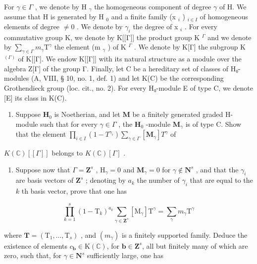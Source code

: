 For \(\gamma\in\Gamma\) , we denote by H \(_{\gamma}\) the homogeneous component of degree \(\gamma\) of H. We assume that H is generated by H \(_{0}\) and a finite family (x \(_{i}\) ) \(_{i\in I}\) of homogeneous elements of degree \(\neq0\) . We denote by \(\gamma_{i}\) the degree of x \(_{i}\) . For every commutative group K, we denote by K{[}{[}Γ{]}{]} the product group K \(^{\Gamma}\) and we denote by \(\sum_{\gamma\in\Gamma}m_{\gamma}\text{T}^{\gamma}\) the element (m \(_{\gamma}\) ) of K \(^{\Gamma}\) . We denote by K{[}Γ{]} the subgroup K \(^{(\Gamma)}\) of K{[}{[}Γ{]}. We endow K{[}{[}Γ{]}{]} with its natural structure as a module over the algebra Z{[}Γ{]} of the group Γ. Finally, let C be a hereditary set of classes of H₀-modules (A, VIII, § 10, no. 1, def. 1) and let K(C) be the corresponding Grothendieck group (loc. cit., no. 2). For every H₀-module E of type C, we denote {[}E{]} its class in K(C).

\begin{enumerate}
\def\labelenumi{\alph{enumi})}
\tightlist
\item
  Suppose \(\mathbf{H}_0\) is Noetherian, and let \(\mathbf{M}\) be a finitely generated graded H-module such that for every \(\gamma \in \Gamma\) , the \(\mathbf{H}_0\) -module \(\mathbf{M}_{\gamma}\) is of type C. Show that the element \(\prod_{i \in I} (1 - T^{\gamma_i}) \sum_{\gamma \in \Gamma} [\mathbf{M}_{\gamma}] T^{\gamma}\) of
\end{enumerate}

\(K(\mathbb{C})[[\Gamma]]\) belongs to \(K(\mathbb{C})[\Gamma]\) .

\begin{enumerate}
\def\labelenumi{\alph{enumi})}
\setcounter{enumi}{1}
\tightlist
\item
  Suppose now that \(\Gamma = \mathbf{Z}^s\) , \(\mathrm{H}_{\gamma} = 0\) and \(\mathbf{M}_{\gamma} = 0\) for \(\gamma \notin \mathbf{N}^s\) , and that the \(\gamma_i\) are basis vectors of \(\mathbf{Z}^s\) ; denoting by \(a_k\) the number of \(\gamma_i\) that are equal to the \(k\) th basis vector, prove that one has
\end{enumerate}

\[
\prod_ {k = 1} ^ {s} (1 - \mathrm{T} _ {k}) ^ {a _ {k}} \sum_ {\gamma \in \mathbf {Z} ^ {s}} [ \mathrm{M} _ {\gamma} ] \mathrm{T} ^ {\gamma} = \sum_ {\gamma} m _ {\gamma} \mathrm{T} ^ {\gamma}
\]

where \(\mathbf{T} = (\mathrm{T}_{1},\dots,\mathrm{T}_{s})\) , and \((m_{\gamma})\) is a finitely supported family. Deduce the existence of elements \(c_{\boldsymbol{b}}\in\mathrm{K}(\mathbb{C})\), for \(\boldsymbol{b}\in\mathbf{Z}^{s}\), all but finitely many of which are zero, such that, for \(\gamma\in\mathbf{N}^{s}\) sufficiently large, one has


